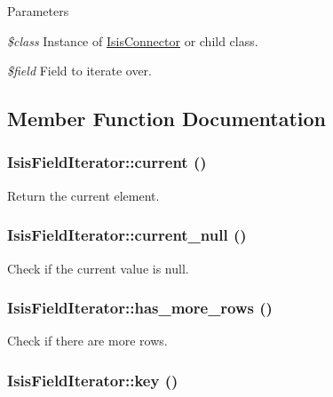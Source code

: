 \begin{DoxyParams}{Parameters}
\item[{\em \$class}]Instance of \hyperlink{classIsisConnector}{IsisConnector} or child class.\item[{\em \$field}]Field to iterate over. \end{DoxyParams}


\subsection{Member Function Documentation}
\hypertarget{classIsisFieldIterator_a23a9cbf26e7786777bca2c7a0cb3d87e}{
\subsubsection[{current}]{\setlength{\rightskip}{0pt plus 5cm}IsisFieldIterator::current ()}}
\label{classIsisFieldIterator_a23a9cbf26e7786777bca2c7a0cb3d87e}
Return the current element. \hypertarget{classIsisFieldIterator_a0904dcbdd044353ef339c4f1a96d4387}{
\subsubsection[{current\_\-null}]{\setlength{\rightskip}{0pt plus 5cm}IsisFieldIterator::current\_\-null ()}}
\label{classIsisFieldIterator_a0904dcbdd044353ef339c4f1a96d4387}
Check if the current value is null. \hypertarget{classIsisFieldIterator_aff5eab62ba63049c0c09609300dfd348}{
\subsubsection[{has\_\-more\_\-rows}]{\setlength{\rightskip}{0pt plus 5cm}IsisFieldIterator::has\_\-more\_\-rows ()}}
\label{classIsisFieldIterator_aff5eab62ba63049c0c09609300dfd348}
Check if there are more rows. \hypertarget{classIsisFieldIterator_afad4839168701adff27f1037b2d8fafc}{
\subsubsection[{key}]{\setlength{\rightskip}{0pt plus 5cm}IsisFieldIterator::key ()}}
